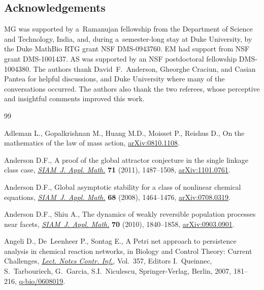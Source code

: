 \documentclass[pdftex]{sigma}
\begin{document}
\subsection*{Acknowledgements} MG was supported by a~Ramanujan fellowship from the Department of Science and
Technology, India, and, during a~semester-long stay at Duke University, by the Duke MathBio RTG grant NSF DMS-0943760.
EM had support from NSF grant DMS-1001437.
AS was supported by an NSF postdoctoral fellowship DMS-1004380.
The authors thank David~F.~Anderson, Gheorghe Craciun, and Casian Pantea for helpful discussions, and Duke University
where many of the conversations occurred.
The authors also thank the two referees, whose perceptive and insightful comments improved this work.


\begin{thebibliography}{99}
\footnotesize\itemsep=0pt

Adleman L., Gopalkrishnan M., Huang M.D., Moisset P., Reishus D., On the
  mathematics of the law of mass action, \href{http://arxiv.org/abs/0810.1108}{arXiv:0810.1108}.

Anderson D.F., A proof of the global attractor conjecture in the single linkage
  class case, \href{http://dx.doi.org/10.1137/11082631X}{\textit{SIAM~J. Appl. Math.}} \textbf{71} (2011), 1487--1508,
  \href{http://arxiv.org/abs/1101.0761}{arXiv:1101.0761}.

Anderson D.F., Global asymptotic stability for a class of nonlinear chemical
  equations, \href{http://dx.doi.org/10.1137/070698282}{\textit{SIAM~J. Appl. Math.}} \textbf{68} (2008), 1464--1476,
  \href{http://arxiv.org/abs/0708.0319}{arXiv:0708.0319}.

Anderson D.F., Shiu A., The dynamics of weakly reversible population processes
  near facets, \href{http://dx.doi.org/10.1137/090764098}{\textit{SIAM~J. Appl. Math.}} \textbf{70} (2010), 1840--1858,
  \href{http://arxiv.org/abs/0903.0901}{arXiv:0903.0901}.

Angeli D., De~Leenheer P., Sontag E., A {P}etri net approach to persistence
  analysis in chemical reaction networks, in Biology and Control Theory:
  Current Challenges, \href{http://dx.doi.org/10.1007/978-3-540-71988-5_9}{\textit{Lect. Notes Contr. Inf.}}, Vol.~357, Editors
  I.~Queinnec, S.~Tarbouriech, G.~Garcia, S.I.~Niculescu, Springer-Verlag,
  Berlin, 2007, 181--216, \href{http://arxiv.org/abs/q-bio/0608019}{q-bio/0608019}.


\end{thebibliography}
\end{document}
